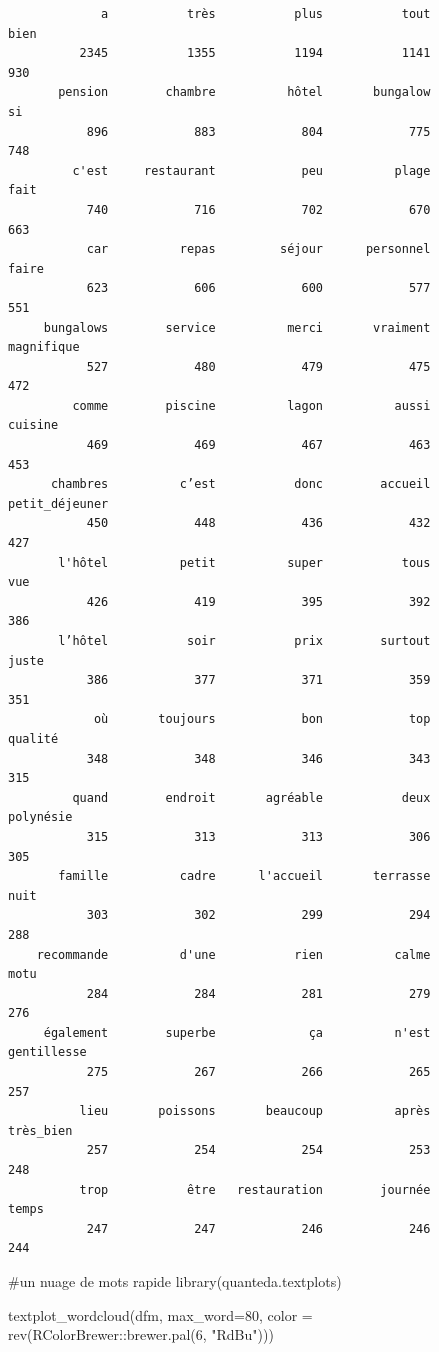 \documentclass[
  letterpaper,
  DIV=11,
  numbers=noendperiod]{scrreprt}
\newenvironment{Shaded}{\begin{snugshade}}{\end{snugshade}}
\newcommand{\AttributeTok}[1]{\textcolor[rgb]{0.40,0.45,0.13}{#1}}
\newcommand{\CommentTok}[1]{\textcolor[rgb]{0.37,0.37,0.37}{#1}}
\newcommand{\DecValTok}[1]{\textcolor[rgb]{0.68,0.00,0.00}{#1}}
\newcommand{\FunctionTok}[1]{\textcolor[rgb]{0.28,0.35,0.67}{#1}}
\newcommand{\NormalTok}[1]{\textcolor[rgb]{0.00,0.23,0.31}{#1}}
\newcommand{\SpecialCharTok}[1]{\textcolor[rgb]{0.37,0.37,0.37}{#1}}
\newcommand{\StringTok}[1]{\textcolor[rgb]{0.13,0.47,0.30}{#1}}
\begin{document}
\begin{verbatim}
             a           très           plus           tout           bien 
          2345           1355           1194           1141            930 
       pension        chambre          hôtel       bungalow             si 
           896            883            804            775            748 
         c'est     restaurant            peu          plage           fait 
           740            716            702            670            663 
           car          repas         séjour      personnel          faire 
           623            606            600            577            551 
     bungalows        service          merci       vraiment     magnifique 
           527            480            479            475            472 
         comme        piscine          lagon          aussi        cuisine 
           469            469            467            463            453 
      chambres          c’est           donc        accueil petit_déjeuner 
           450            448            436            432            427 
       l'hôtel          petit          super           tous            vue 
           426            419            395            392            386 
       l’hôtel           soir           prix        surtout          juste 
           386            377            371            359            351 
            où       toujours            bon            top        qualité 
           348            348            346            343            315 
         quand        endroit       agréable           deux      polynésie 
           315            313            313            306            305 
       famille          cadre      l'accueil       terrasse           nuit 
           303            302            299            294            288 
    recommande          d'une           rien          calme           motu 
           284            284            281            279            276 
     également        superbe             ça          n'est    gentillesse 
           275            267            266            265            257 
          lieu       poissons       beaucoup          après      très_bien 
           257            254            254            253            248 
          trop           être   restauration        journée          temps 
           247            247            246            246            244 
\end{verbatim}

\begin{Shaded}
\begin{Highlighting}[]
\CommentTok{\#un nuage de mots rapide library(quanteda.textplots) }

\FunctionTok{textplot\_wordcloud}\NormalTok{(dfm, }\AttributeTok{max\_word=}\DecValTok{80}\NormalTok{, }\AttributeTok{color =} \FunctionTok{rev}\NormalTok{(RColorBrewer}\SpecialCharTok{::}\FunctionTok{brewer.pal}\NormalTok{(}\DecValTok{6}\NormalTok{, }\StringTok{"RdBu"}\NormalTok{)))}
\end{Highlighting}
\end{Shaded}
\end{document}
